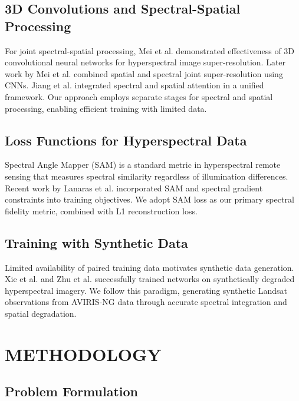 \documentclass[]{spieman}
\begin{document}
\subsection{3D Convolutions and Spectral-Spatial Processing}

For joint spectral-spatial processing, Mei et al. \cite{mei2019hyperspectral} demonstrated effectiveness of 3D convolutional neural networks for hyperspectral image super-resolution. Later work by Mei et al. \cite{mei2020spatial} combined spatial and spectral joint super-resolution using CNNs. Jiang et al. \cite{jiang2020deep} integrated spectral and spatial attention in a unified framework. Our approach employs separate stages for spectral and spatial processing, enabling efficient training with limited data.

\subsection{Loss Functions for Hyperspectral Data}

Spectral Angle Mapper (SAM) \cite{kruse1993spectral} is a standard metric in hyperspectral remote sensing that measures spectral similarity regardless of illumination differences. Recent work by Lanaras et al. \cite{lanaras2021hyperspectral} incorporated SAM and spectral gradient constraints into training objectives. We adopt SAM loss as our primary spectral fidelity metric, combined with L1 reconstruction loss.

\subsection{Training with Synthetic Data}

Limited availability of paired training data motivates synthetic data generation. Xie et al. \cite{xie2018multispectral} and Zhu et al. \cite{zhu2021hyperspectral} successfully trained networks on synthetically degraded hyperspectral imagery. We follow this paradigm, generating synthetic Landsat observations from AVIRIS-NG data through accurate spectral integration and spatial degradation.

\section{METHODOLOGY}
\label{sec:method}

\subsection{Problem Formulation}
\end{document}

